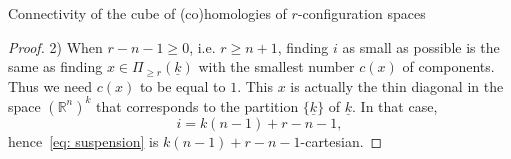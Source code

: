 \documentclass[12pt]{amsart}
\newcommand{\R}{{\mathbb R}}
\theoremstyle{plain}
\theoremstyle{definition}
\theoremstyle{remark}
\begin{document}
\begin{section}{Connectivity of the cube of (co)homologies of $r$-configuration spaces}
\begin{proof}

2) When  $r-n-1\ge 0$, i.e. $r\ge n+1$, finding $i$ as small as possible is the same as finding $x \in \Pi_{\geq r}(\underline{k})$ with the smallest number $c(x)$ of components. Thus we need $c(x)$ to be equal to $1$. This $x$ is actually the thin diagonal in the space $(\R^n)^k$ that corresponds to the partition $\{\underline{k}\}$ of $\underline{k}$. In that case,
$$i=k(n-1)+r-n-1,$$
hence~\eqref{eq: suspension} is $k(n-1)+r-n-1$-cartesian.
\end{proof}


\end{section}
\vspace*{0.5cm}
\end{document}
